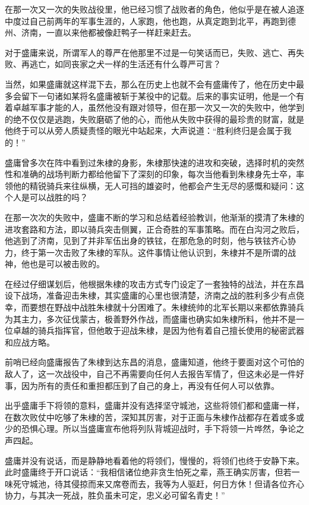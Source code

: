 \begin{multicols}{\theparacolNo}
		在那一次又一次的失败战役里，他已经习惯了战败者的角色，他似乎是在被人追逐中度过自己前两年的军事生涯的，人家跑，他也跑，从真定跑到北平，再跑到德州、济南，一直以来他都被像赶鸭子一样赶来赶去。

		对于盛庸来说，所谓军人的尊严在他那里不过是一句笑话而已，失败、逃亡、再失败、再逃亡，如同丧家之犬一样的生活还有什么尊严可言？

		当然，如果盛庸就这样混下去，那么在历史上也就不会有盛庸传了，他在历史中最多会留下一句诸如某将名盛庸被斩于某役中的记载。后来的事实证明，他是一个有着卓越军事才能的人，虽然他没有跟对领导，但在那一次又一次的失败中，他学到的绝不仅仅是逃跑，失败磨砺了他的心，而他从失败中获得的最珍贵的财富，就是他终于可以从旁人质疑责怪的眼光中站起来，大声说道：“胜利终归是会属于我的！”

		盛庸曾多次在阵中看到过朱棣的身影，朱棣那快速的进攻和突破，选择时机的突然性和准确的战场判断力都给他留下了深刻的印象，每次当他看到朱棣身先士卒，率领他的精锐骑兵来往纵横，无人可挡的雄姿时，他都会产生无尽的感慨和疑问：这个人是可以战胜的吗？

		在那一次次的失败中，盛庸不断的学习和总结着经验教训，他渐渐的摸清了朱棣的进攻套路和方法，即以骑兵突击侧翼，正合奇胜的军事策略。而在白沟河之败后，他逃到了济南，见到了并非军伍出身的铁铉，在那危急的时刻，他与铁铉齐心协力，终于第一次击败了朱棣的军队。这件事情让他认识到，朱棣并不是所谓的战神，他也是可以被击败的。

		在经过仔细谋划后，他根据朱棣的攻击方式专门设定了一套独特的战法，并在东昌设下战场，准备迎击朱棣，其实盛庸的心里也很清楚，济南之战的胜利多少有点侥幸，而要想在野战中战胜朱棣就十分困难了。朱棣统帅的北军长期以来都依靠骑兵为其主力，多次征伐蒙古，极善野外作战，而盛庸也确实如朱棣所料，他并不是一位卓越的骑兵指挥官，但他敢于迎战朱棣，是因为他有着自己擅长使用的秘密武器和应战方略。

		前哨已经向盛庸报告了朱棣到达东昌的消息，盛庸知道，他终于要面对这个可怕的敌人了，这一次战役中，自己不再需要向任何人去报告军情了，但这未必是一件好事，因为所有的责任和重担都压到了自己的身上，再没有任何人可以依靠。

		出乎盛庸手下将领的意料，盛庸并没有选择坚守城池，这些将领们都和盛庸一样，在数次败仗中吃够了朱棣的苦，深知其厉害，对于正面与朱棣作战都存在着或多或少的恐惧心理。所以当盛庸宣布他将列队背城迎战时，手下将领一片哗然，争论之声四起。

		盛庸并没有说话，而是静静地看着他的将领们，慢慢的，将领们也终于安静下来。此时盛庸终于开口说话：“我相信诸位绝非贪生怕死之辈，燕王确实厉害，但若一味死守城池，待其侵掠而来又席卷而去，我等为人驱赶，何日方休！但请各位齐心协力，与其决一死战，胜负虽未可定，忠义必可留名青史！”


\end{multicols}
